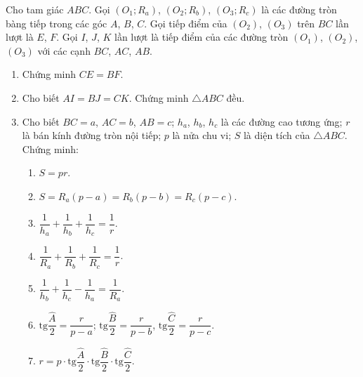 \begin{bt}%
	Cho tam giác $ABC$. Gọi $\left(O_1;R_a\right)$, $\left(O_2;R_b\right)$, $\left(O_3;R_c\right)$ là các đường tròn bàng tiếp trong các góc $A$, $B$, $C$. Gọi tiếp điểm của $\left(O_2\right)$, $\left(O_3\right)$ trên $BC$ lần lượt là $E$, $F$. Gọi $I$, $J$, $K$ lần lượt là tiếp điểm của các đường tròn $\left(O_1\right)$, $\left(O_2\right)$, $\left(O_3\right)$ với các cạnh $BC$, $AC$, $AB$.
	\begin{enumerate}
		\item Chứng minh $CE=BF$.
		\item Cho biết $AI=BJ=CK$. Chứng minh $\triangle ABC$ đều.
		\item Cho biết $BC=a$, $AC=b$, $AB=c$; $h_a$, $h_b$, $h_c$ là các đường cao tương ứng; $r$ là bán kính đường tròn nội tiếp; $p$ là nửa chu vi; $S$ là diện tích của $\triangle ABC$. Chứng minh:
		\begin{enumerate}[1)]
			\item $S=pr$.
			\item $S=R_a(p-a)=R_b(p-b)=R_c(p-c)$.
			\item $\dfrac{1}{h_a}+\dfrac{1}{h_b}+\dfrac{1}{h_c}=\dfrac{1}{r}$.
			\item $\dfrac{1}{R_a}+\dfrac{1}{R_b}+\dfrac{1}{R_c}=\dfrac{1}{r}$.
			\item $\dfrac{1}{h_b}+\dfrac{1}{h_c}-\dfrac{1}{h_a}=\dfrac{1}{R_a}$.
			\item $\mathrm{tg} \dfrac{\widehat{A}}{2}=\dfrac{r}{p-a}$; $\mathrm{tg} \dfrac{\widehat{B}}{2}=\dfrac{r}{p-b}$, $\mathrm{tg} \dfrac{\widehat{C}}{2}=\dfrac{r}{p-c}$.
			\item $r=p\cdot \mathrm{tg}\dfrac{\widehat{A}}{2}\cdot \mathrm{tg}\dfrac{\widehat{B}}{2}\cdot \mathrm{tg}\dfrac{\widehat{C}}{2}$.
		\end{enumerate}	
	\end{enumerate}	
\end{bt}
